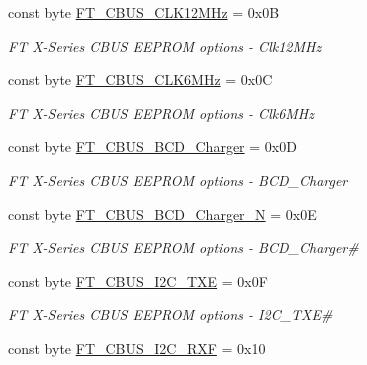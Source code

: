 \begin{DoxyCompactItemize}
const byte \mbox{\hyperlink{class_f_t_d2_x_x___n_e_t_1_1_f_t_d_i_1_1_f_t___x_s_e_r_i_e_s___c_b_u_s___o_p_t_i_o_n_s_ac2bf45288a38270b9e9d03b2072f5775}{F\+T\+\_\+\+C\+B\+U\+S\+\_\+\+C\+L\+K12\+M\+Hz}} = 0x0B
\begin{DoxyCompactList}\small\item\em FT X-\/\+Series C\+B\+US E\+E\+P\+R\+OM options -\/ Clk12\+M\+Hz \end{DoxyCompactList}\item 
const byte \mbox{\hyperlink{class_f_t_d2_x_x___n_e_t_1_1_f_t_d_i_1_1_f_t___x_s_e_r_i_e_s___c_b_u_s___o_p_t_i_o_n_s_af625e0ba106c0b72a01c00944cd91ced}{F\+T\+\_\+\+C\+B\+U\+S\+\_\+\+C\+L\+K6\+M\+Hz}} = 0x0C
\begin{DoxyCompactList}\small\item\em FT X-\/\+Series C\+B\+US E\+E\+P\+R\+OM options -\/ Clk6\+M\+Hz \end{DoxyCompactList}\item 
const byte \mbox{\hyperlink{class_f_t_d2_x_x___n_e_t_1_1_f_t_d_i_1_1_f_t___x_s_e_r_i_e_s___c_b_u_s___o_p_t_i_o_n_s_a08a4201719fbee0d0c2b471f1454b3bb}{F\+T\+\_\+\+C\+B\+U\+S\+\_\+\+B\+C\+D\+\_\+\+Charger}} = 0x0D
\begin{DoxyCompactList}\small\item\em FT X-\/\+Series C\+B\+US E\+E\+P\+R\+OM options -\/ B\+C\+D\+\_\+\+Charger \end{DoxyCompactList}\item 
const byte \mbox{\hyperlink{class_f_t_d2_x_x___n_e_t_1_1_f_t_d_i_1_1_f_t___x_s_e_r_i_e_s___c_b_u_s___o_p_t_i_o_n_s_a9b6083238951ae4ee2f5682fdd002311}{F\+T\+\_\+\+C\+B\+U\+S\+\_\+\+B\+C\+D\+\_\+\+Charger\+\_\+N}} = 0x0E
\begin{DoxyCompactList}\small\item\em FT X-\/\+Series C\+B\+US E\+E\+P\+R\+OM options -\/ B\+C\+D\+\_\+\+Charger\# \end{DoxyCompactList}\item 
const byte \mbox{\hyperlink{class_f_t_d2_x_x___n_e_t_1_1_f_t_d_i_1_1_f_t___x_s_e_r_i_e_s___c_b_u_s___o_p_t_i_o_n_s_a8fd98b697ba2935635ac035b13c694ba}{F\+T\+\_\+\+C\+B\+U\+S\+\_\+\+I2\+C\+\_\+\+T\+XE}} = 0x0F
\begin{DoxyCompactList}\small\item\em FT X-\/\+Series C\+B\+US E\+E\+P\+R\+OM options -\/ I2\+C\+\_\+\+T\+XE\# \end{DoxyCompactList}\item 
const byte \mbox{\hyperlink{class_f_t_d2_x_x___n_e_t_1_1_f_t_d_i_1_1_f_t___x_s_e_r_i_e_s___c_b_u_s___o_p_t_i_o_n_s_a645b63b86136d9887216f9bc9192898a}{F\+T\+\_\+\+C\+B\+U\+S\+\_\+\+I2\+C\+\_\+\+R\+XF}} = 0x10

\end{DoxyCompactItemize}
